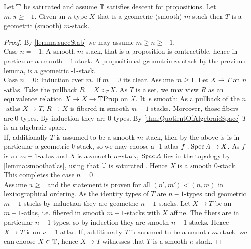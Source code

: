 \documentclass{article}
\begin{document}
\begin{theorem}
    Let $\mathbb{T}$ be saturated and assume $\mathbb{T}$ satisfies descent for propositions. Let $m , n \ge -1$. Given an $n$-type $X$ that is a geometric (smooth) $m$-stack then $T$ is a geometric (smooth) $m$-stack.
\end{theorem}
\begin{proof}
    By \ref{lemma:succStab} we may assume $m \ge n \ge -1$. \\
    Case $n=-1$: A smooth $m$-stack, that is a proposition is contractible, hence in particular a smooth $-1$-stack. A propositional geometric $m$-stack by the previous lemma, is a geometric -1-stack. \\
    Case $n =0$: Induction over $m$. If $m=0$ its clear. Assume $m \ge 1$. Let $X \to T$ an $n$-atlas. Take the pullback $R = X \times_T X$. As $T$ is a set, we may view $R$ as an equivalence relation $X \to X \to \mathbb{T} \operatorname{Prop}$ on $X$. It is smooth: As a pullback of the $n$-atlas $X \to T$, $R \to X$ is fibered in smooth $m-1$ stacks. Moreover, those fibers are 0-types. By induction they are 0-types. By \ref{thm:QuotientOfAlgebraicSpace} $T$ is an algebraic space. \\
    If, additionally $T$ is assumed to be a smooth $m$-stack, then by the above is is in particular a geometric 0-stack, so we may choose a -1-atlas $f : \operatorname{Spec} A \to X$. As $f$ is an $m-1$-atlas and $X$ is a smooth $m$-stack, $\operatorname{Spec} A$ lies in the topology by \ref{lemma:smoothatlas}, using that $\mathbb{T}$ is saturated . Hence $X$ is a smooth 0-stack. This completes the case $n=0$ \\
    Assume $n \ge 1$ and the statement is proven for all $(n',m') < (n,m)$ in lexicographical ordering. As the identity types of $T$ are $n-1$-types and geometric $m-1$ stacks by induction they are geometric $n-1$ stacks. Let $X \to T$ be an $m-1$-atlas, i.e. fibered in smooth $m-1$-stacks with $X$ affine. The fibers are in particular $n-1$-types, so by induction they are smooth $n-1$-stacks. Hence $X \to T$ is an $n-1$-atlas. If, additionally $T$ is assumed to be a smooth $m$-stack, we can choose $X \in \mathbb{T}$, hence $X \to T$ witnesses that $T$ is a smooth $n$-stack.
    
\end{proof}
\end{document}
